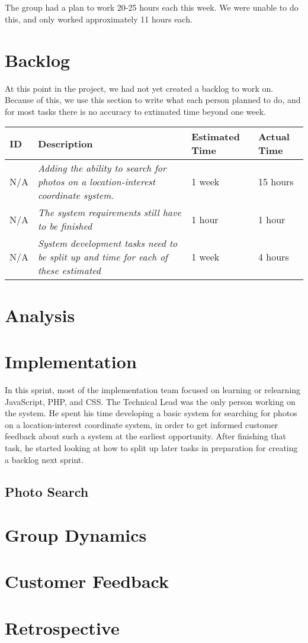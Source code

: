 \subparagraph{} The group had a plan to work 20-25 hours each this week. We were unable to do this, and only worked approximately 11 hours each. %

\section{Backlog}
At this point in the project, we had not yet created a backlog to work on. Because of this, we use this section to write what each person planned to do, and for most tasks there is no accuracy to extimated time beyond one week. \\
\begin{minipage}{\linewidth}
\setlength{\tabcolsep}{12pt}
\centering
{}
\begin{tabular}{|p{1cm}|p{4cm}|p{2cm}|p{2cm}|}
\hline
\cellcolor{gray!25} ID & \cellcolor{gray!25} Description & \cellcolor{gray!25} Estimated Time & \cellcolor{gray!25} Actual Time \\
\hline
N/A & \it{Adding the ability to search for photos on a location-interest coordinate system.} & 1 week & 15 hours \\
N/A & \it{The system requirements still have to be finished} & 1 hour & 1 hour \\
N/A & \it{System development tasks need to be split up and time for each of these estimated} & 1 week & 4 hours \\
\hline
\end{tabular}
\end{minipage}

\section{Analysis}

\section{Implementation}
In this sprint, most of the implementation team focused on learning or relearning JavaScript, PHP, and CSS. The Technical Lead was the only person working on the system. He spent his time developing a basic system for searching for photos on a location-interest coordinate system, in order to get informed customer feedback about such a system at the earliest opportunity. After finishing that task, he started looking at how to split up later tasks in preparation for creating a backlog next sprint.
\subsection*{Photo Search}


\section{Group Dynamics}

\section{Customer Feedback}

\section{Retrospective}